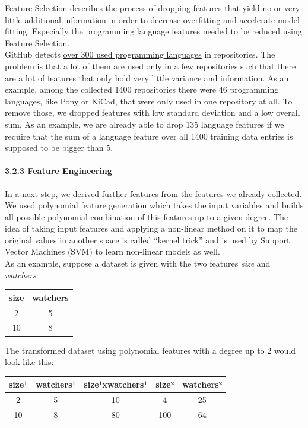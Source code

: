 \documentclass{article}
\begin{document}
Feature Selection describes the process of dropping features that yield
no or very little additional information in order to decrease
overfitting and accelerate model fitting. Especially the programming
language features needed to be reduced using Feature Selection.\\
GitHub detects
\href{https://github.com/github/linguist/blob/master/lib/linguist/languages.yml}{over
300 used programming languages} in repositories. The problem is that a
lot of them are used only in a few repositories such that there are a
lot of features that only hold very little variance and information. As
an example, among the collected 1400 repositories there were 46
programming languages, like Pony or KiCad, that were only used in one
repository at all. To remove those, we dropped features with low
standard deviation and a low overall sum. As an example, we are already
able to drop 135 language features if we require that the sum of a
language feature over all 1400 training data entries is supposed to be
bigger than 5.

\paragraph{3.2.3 Feature Engineering}\label{feature-engineering}

In a next step, we derived further features from the features we already
collected. We used polynomial feature generation which takes the input
variables and builds all possible polynomial combination of this
features up to a given degree. The idea of taking input features and
applying a non-linear method on it to map the original values in another
space is called ``kernel trick'' and is used by Support Vector Machines
(SVM) to learn non-linear models as well.\\
As an example, suppose a dataset is given with the two features
\emph{size} and \emph{watchers}:

\begin{longtable}[]{@{}cc@{}}
\toprule
size & watchers\tabularnewline
\midrule
\endhead
2 & 5\tabularnewline
10 & 8\tabularnewline
\bottomrule
\end{longtable}

The transformed dataset using polynomial features with a degree up to 2
would look like this:

\begin{longtable}[]{@{}ccccc@{}}
\toprule
size¹ & watchers¹ & size¹xwatchers¹ & size² & watchers²\tabularnewline
\midrule
\endhead
2 & 5 & 10 & 4 & 25\tabularnewline
10 & 8 & 80 & 100 & 64\tabularnewline
\bottomrule
\end{longtable}
\end{document}

